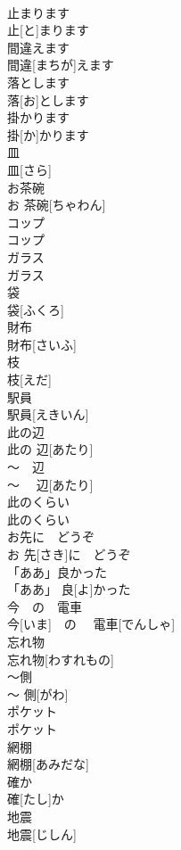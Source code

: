 \documentclass[8pt]{extreport}
\begin{document}
\begin{CJK}{UTF8}{min}
\\	止まります	
\\	止[と]まります	
\\	間違えます	
\\	間違[まちが]えます	
\\	落とします	
\\	落[お]とします	
\\	掛かります
\\	掛[か]かります
\\	皿	
\\	皿[さら]	
\\	お茶碗	
\\	お 茶碗[ちゃわん]	
\\	コップ	
\\	コップ	
\\	ガラス	
\\	ガラス	
\\	袋	
\\	袋[ふくろ]	
\\	財布	
\\	財布[さいふ]	
\\	枝	
\\	枝[えだ]	
\\	駅員	
\\	駅員[えきいん]	
\\	此の辺	
\\	此の 辺[あたり]	
\\	〜　辺	
\\	〜　 辺[あたり]	
\\	此のくらい	
\\	此のくらい	
\\	お先に　どうぞ	
\\	お 先[さき]に　どうぞ	
\\	「ああ」良かった	
\\	「ああ」 良[よ]かった	
\\	今　の　電車	
\\	今[いま]　の　 電車[でんしゃ]	
\\	忘れ物	
\\	忘れ物[わすれもの]	
\\	〜側	
\\	〜 側[がわ]	
\\	ポケット	
\\	ポケット	
\\	網棚	
\\	網棚[あみだな]	
\\	確か	
\\	確[たし]か	
\\	地震	
\\	地震[じしん]	

\end{CJK}
\end{document}
